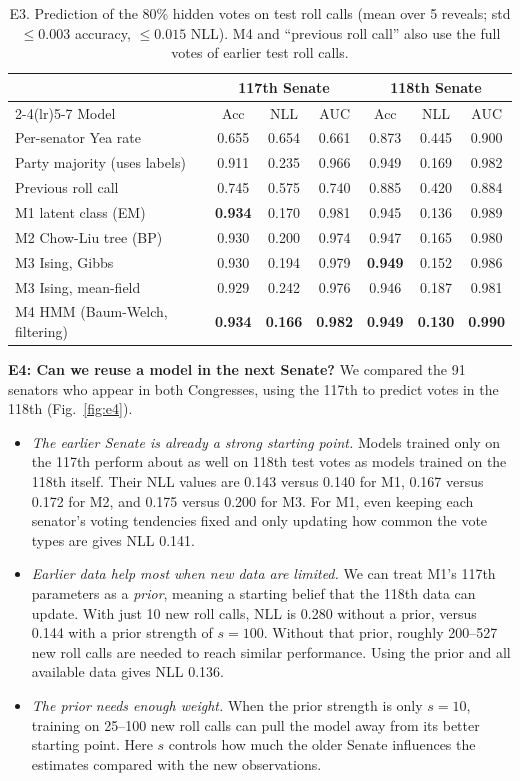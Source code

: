 \documentclass[10pt]{article}
\begin{document}
\begin{table}[H] 
\centering\small
\caption{E3. Prediction of the 80\% hidden votes on test roll calls (mean over 5 reveals; std $\le0.003$ accuracy,
$\le0.015$ NLL). M4 and ``previous roll call'' also use the full votes of earlier test roll calls.}
\label{tab:e3}
\begin{tabular}{lcccccc}
\toprule
& \multicolumn{3}{c}{117th Senate} & \multicolumn{3}{c}{118th Senate}\\
\cmidrule(lr){2-4}\cmidrule(lr){5-7}
Model & Acc & NLL & AUC & Acc & NLL & AUC\\
\midrule
Per-senator Yea rate & 0.655 & 0.654 & 0.661 & 0.873 & 0.445 & 0.900\\
Party majority (uses labels) & 0.911 & 0.235 & 0.966 & 0.949 & 0.169 & 0.982\\
Previous roll call & 0.745 & 0.575 & 0.740 & 0.885 & 0.420 & 0.884\\
M1 latent class (EM) & \textbf{0.934} & 0.170 & 0.981 & 0.945 & 0.136 & 0.989\\
M2 Chow-Liu tree (BP) & 0.930 & 0.200 & 0.974 & 0.947 & 0.165 & 0.980\\
M3 Ising, Gibbs & 0.930 & 0.194 & 0.979 & \textbf{0.949} & 0.152 & 0.986\\
M3 Ising, mean-field & 0.929 & 0.242 & 0.976 & 0.946 & 0.187 & 0.981\\
M4 HMM (Baum-Welch, filtering) & \textbf{0.934} & \textbf{0.166} & \textbf{0.982} & \textbf{0.949} & \textbf{0.130} & \textbf{0.990}\\
\bottomrule
\end{tabular}
\end{table}

\textbf{E4: Can we reuse a model in the next Senate?} We compared the 91 senators who appear in both Congresses, using the 117th to predict votes in the 118th (Fig.~\ref{fig:e4}).
\begin{itemize}
\item \emph{The earlier Senate is already a strong starting point.} Models trained only on the 117th perform about as well on 118th test votes as models trained on the 118th itself. Their NLL values are 0.143 versus 0.140 for M1, 0.167 versus 0.172 for M2, and 0.175 versus 0.200 for M3. For M1, even keeping each senator's voting tendencies fixed and only updating how common the vote types are gives NLL 0.141.
\item \emph{Earlier data help most when new data are limited.} We can treat M1's 117th parameters as a \emph{prior}, meaning a starting belief that the 118th data can update. With just 10 new roll calls, NLL is 0.280 without a prior, versus 0.144 with a prior strength of $s=100$. Without that prior, roughly 200--527 new roll calls are needed to reach similar performance. Using the prior and all available data gives NLL 0.136.
\item \emph{The prior needs enough weight.} When the prior strength is only $s=10$, training on 25--100 new roll calls can pull the model away from its better starting point. Here $s$ controls how much the older Senate influences the estimates compared with the new observations.
\end{itemize}
\end{document}
